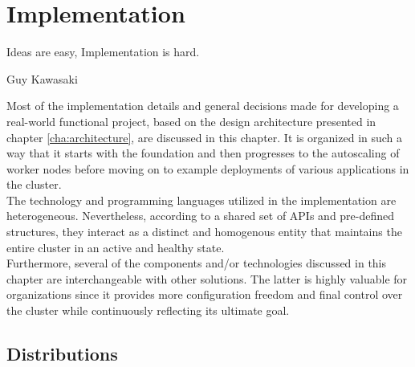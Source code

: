 \chapter{Implementation}
\label{cha:implementation}

\epigraph{Ideas are easy, Implementation is hard.}{Guy Kawasaki}

Most of the implementation details and general decisions made for developing a
real-world functional project, based on the design architecture presented in chapter
\ref{cha:architecture}, are discussed in this chapter. It is organized in such a
way that it starts with the foundation and then progresses to the autoscaling of
worker nodes before moving on to example deployments of various applications in the
cluster. \\ %
The technology and programming languages utilized in the implementation are heterogeneous.
Nevertheless, according to a shared set of APIs and pre-defined structures, they
interact as a distinct and homogenous entity that maintains the entire cluster
in an active and healthy state. \\ %
Furthermore, several of the components and/or technologies discussed in this chapter
are interchangeable with other solutions. The latter is highly valuable for
organizations since it provides more configuration freedom and final control
over the cluster while continuously reflecting its ultimate goal.

\section{Distributions}
\label{sec:implementation_distributions}


